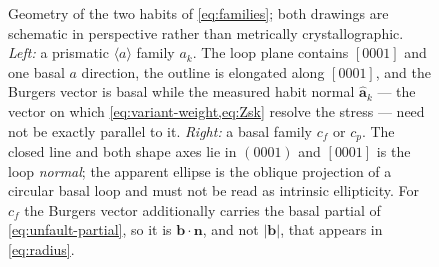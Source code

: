 \documentclass{article}
\newcommand{\aloop}{\ensuremath{\langle a\rangle}}
\newcommand{\bvec}{\bm b}
\newcommand{\nvec}{\bm n}
\begin{document}
\begin{figure}[htbp]
\begin{minipage}[t]{0.49\textwidth}
{}
\end{minipage}
\caption{Geometry of the two habits of \cref{eq:families}; both drawings are
schematic in perspective rather than metrically crystallographic. \emph{Left:} a
prismatic \aloop{} family $a_k$. The loop plane contains $[0001]$ and one basal
$a$ direction, the outline is elongated along $[0001]$, and the Burgers vector
is basal while the measured habit normal $\hat{\bm a}_k$ --- the vector on which
\cref{eq:variant-weight,eq:Zsk} resolve the stress --- need not be exactly
parallel to it. \emph{Right:} a basal family $c_f$ or $c_p$. The closed line and
both shape axes lie in $(0001)$ and $[0001]$ is the loop \emph{normal}; the
apparent ellipse is the oblique projection of a circular basal loop and must not
be read as intrinsic ellipticity. For $c_f$ the Burgers vector additionally
carries the basal partial of \cref{eq:unfault-partial}, so it is
$\bvec\!\cdot\!\nvec$, and not $|\bvec|$, that appears in \cref{eq:radius}.}
\label{fig:loop-geometry}
\end{figure}
\end{document}
